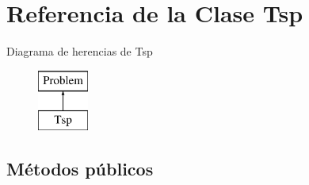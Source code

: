\hypertarget{class_tsp}{\section{Referencia de la Clase Tsp}
\label{class_tsp}
}
Diagrama de herencias de Tsp\begin{figure}[H]
\begin{center}
\leavevmode
\includegraphics[height=2.000000cm]{class_tsp}
\end{center}
\end{figure}
\subsection*{Métodos públicos}
